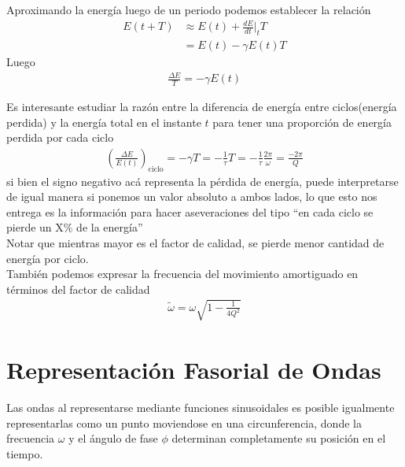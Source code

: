 \documentclass[12pt]{article}
\begin{document}
Aproximando la energía luego de un periodo podemos establecer la relación
\begin{align*}
    E(t+ T) &\approx E(t) + \frac{dE}{dt} \Bigg|_t T \\
        &= E(t) - \gamma E(t) T
\end{align*}
Luego
\begin{align*}
    \frac{\Delta E}{T} = -\gamma E(t)
\end{align*}

Es interesante estudiar la razón entre la diferencia de energía entre ciclos(energía perdida) y la energía total en el instante \(t\) para tener una proporción de energía perdida por cada ciclo
\begin{align*}
   \left( \frac{\Delta E}{E(t)} \right)_\text{ciclo}= -\gamma T =- \frac{1}{\tau}T = - \frac{1}{\tau}\frac{2\pi}{\omega} = \frac{-2\pi}{Q}
\end{align*}
si bien el signo negativo acá representa la pérdida de energía, puede interpretarse de igual manera si ponemos un valor absoluto a ambos lados, lo que esto nos entrega es la información para hacer aseveraciones del tipo ``en cada ciclo se pierde un X\% de la energía''\\

Notar que mientras mayor es el factor de calidad, se pierde menor cantidad de energía por ciclo.\\

También podemos expresar la frecuencia del movimiento amortiguado en términos del factor de calidad
\begin{align*}
    \tilde{\omega} = \omega \sqrt{1- \frac{1}{4Q^{2}}}
\end{align*}

\section{Representación Fasorial de Ondas}

Las ondas al representarse mediante funciones sinusoidales es posible igualmente representarlas como un punto moviendose en una circunferencia, donde la frecuencia \(\omega\) y el ángulo de fase \(\phi\) determinan completamente su posición en el tiempo.\\
\end{document}
